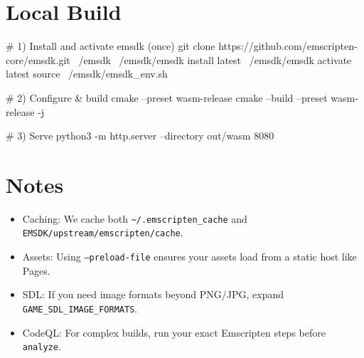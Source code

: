 \documentclass[11pt]{article}
\begin{document}

\section{Local Build}

\begin{bashcode}
# 1) Install and activate emsdk (once)
git clone https://github.com/emscripten-core/emsdk.git ~/emsdk
~/emsdk/emsdk install latest
~/emsdk/emsdk activate latest
source ~/emsdk/emsdk_env.sh

# 2) Configure & build
cmake --preset wasm-release
cmake --build --preset wasm-release -j

# 3) Serve
python3 -m http.server --directory out/wasm 8080
\end{bashcode}

\section{Notes}

\begin{itemize}
  \item Caching: We cache both \texttt{\textasciitilde/.emscripten\_cache} and \texttt{EMSDK/upstream/emscripten/cache}.
  \item Assets: Using \texttt{--preload-file} ensures your assets load from a static host like Pages.
  \item SDL: If you need image formats beyond PNG/JPG, expand \texttt{GAME\_SDL\_IMAGE\_FORMATS}.
  \item CodeQL: For complex builds, run your exact Emscripten steps before \texttt{analyze}.
\end{itemize}
\end{document}
